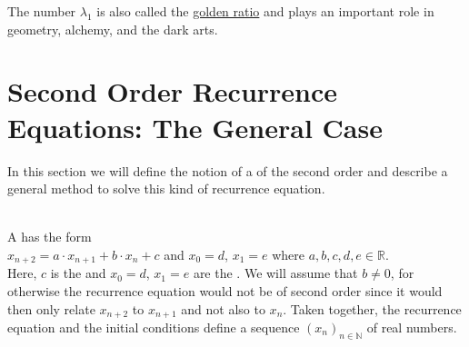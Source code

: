 \remark 
The number $\lambda_1$ is also called the \href{https://en.wikipedia.org/wiki/Golden_ratio}{golden ratio} 
and plays an important role in geometry, alchemy, and the dark arts. \eoxs

\section[The General Case]{Second Order Recurrence Equations: The General Case}
In this section we will define the notion of a 
of the second order and describe a general method to solve this kind of recurrence equation.

\begin{Definition} \hspace*{\fill} \\
  A 
  has the form
  \\[0.2cm]
  \hspace*{1.3cm}
  $x_{n+2} = a \cdot x_{n+1} + b \cdot x_n + c$ \quad and \quad $x_0 = d$, $x_1 = e$
  \quad where $a, b, c, d, e \in \mathbb{R}$.
  \\[0.2cm]
  Here, $c$ is the  and $x_0 = d$, $x_1 = e$ are the .
  We will assume that $b \not= 0$, for otherwise the recurrence equation would not be of second order since it
  would then only relate $x_{n+2}$ to $x_{n+1}$ and not also to $x_n$.
  Taken together, the recurrence equation and the initial conditions define a sequence $(x_n)_{n\in\mathbb{N}}$ of real numbers.  \eox
\end{Definition}

